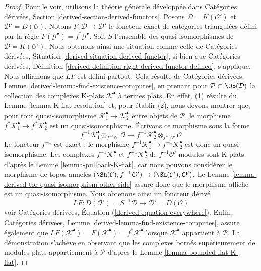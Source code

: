 \begin{proof}
Pour le voir, utilisons la théorie générale développée dans
Catégories dérivées, Section \ref{derived-section-derived-functors}.
Posons $\mathcal{D} = K(\mathcal{O}')$ et $\mathcal{D}' = D(\mathcal{O})$.
Notons $F : \mathcal{D} \to \mathcal{D}'$ le foncteur exact de catégories
triangulées défini par la règle
$F(\mathcal{G}^\bullet) = f^*\mathcal{G}^\bullet$.
Soit $S$ l'ensemble des quasi-isomorphismes de
$\mathcal{D} = K(\mathcal{O}')$. Nous obtenons ainsi une situation comme
celle de Catégories dérivées, Situation
\ref{derived-situation-derived-functor}, si bien que Catégories dérivées,
Définition \ref{derived-definition-right-derived-functor-defined},
s'applique. Nous affirmons que $LF$ est défini partout. Cela résulte de
Catégories dérivées, Lemme \ref{derived-lemma-find-existence-computes},
en prenant pour $\mathcal{P} \subset \Ob(\mathcal{D})$ la collection des
complexes K-plats $\mathcal{K}^\bullet$ à termes plats. En effet, (1)
résulte du Lemme \ref{lemma-K-flat-resolution} et, pour établir (2), nous
devons montrer que, pour tout quasi-isomorphisme
$\mathcal{K}_1^\bullet  \to \mathcal{K}_2^\bullet$ entre objets de
$\mathcal{P}$, le morphisme
$f^*\mathcal{K}_1^\bullet  \to f^*\mathcal{K}_2^\bullet$ est un
quasi-isomorphisme. Écrivons ce morphisme sous la forme
$$
f^{-1}\mathcal{K}_1^\bullet \otimes_{f^{-1}\mathcal{O}'} \mathcal{O}
\longrightarrow
f^{-1}\mathcal{K}_2^\bullet \otimes_{f^{-1}\mathcal{O}'} \mathcal{O}
$$
Le foncteur $f^{-1}$ est exact ; le morphisme
$f^{-1}\mathcal{K}_1^\bullet  \to f^{-1}\mathcal{K}_2^\bullet$ est donc un
quasi-isomorphisme. Les complexes
 $f^{-1}\mathcal{K}_1^\bullet$ et $f^{-1}\mathcal{K}_2^\bullet$
de $f^{-1}\mathcal{O}'$-modules sont K-plats d'après le Lemme
\ref{lemma-pullback-K-flat}, car nous pouvons considérer le morphisme de
topos annelés
$(\Sh(\mathcal{C}), f^{-1}\mathcal{O}') \to
(\Sh(\mathcal{C}'), \mathcal{O}')$. Le Lemme
\ref{lemma-derived-tor-quasi-isomorphism-other-side} assure donc que le
morphisme affiché est un quasi-isomorphisme. Nous obtenons ainsi un
foncteur dérivé
$$
LF :
D(\mathcal{O}') = S^{-1}\mathcal{D}
\longrightarrow
\mathcal{D}' = D(\mathcal{O})
$$
voir Catégories dérivées, Équation (\ref{derived-equation-everywhere}).
Enfin, Catégories dérivées, Lemme
\ref{derived-lemma-find-existence-computes}, assure également que
$LF(\mathcal{K}^\bullet) = F(\mathcal{K}^\bullet) = f^*\mathcal{K}^\bullet$
lorsque $\mathcal{K}^\bullet$ appartient à $\mathcal{P}$.
La démonstration s'achève en observant que les complexes bornés
supérieurement de modules plats appartiennent à $\mathcal{P}$ d'après le
Lemme \ref{lemma-bounded-flat-K-flat}.
\end{proof}


